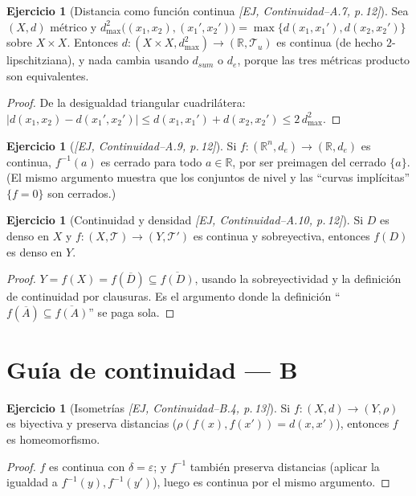 \documentclass[11pt,a4paper]{article}
\theoremstyle{definition}
\newtheorem{ejercicio}[definicion]{Ejercicio}
\theoremstyle{plain}
\newcommand{\fnt}[1]{{\normalfont\small\itshape\color{gray!150!black}[#1]}}
\newcommand{\R}{\mathbb{R}}
\newcommand{\cl}[1]{\overline{#1}}
\newcommand{\tp}{\mathcal{T}}
\begin{document}
\begin{ejercicio}[Distancia como función continua \fnt{EJ, Continuidad--A.7, p.\,12}]
Sea $(X,d)$ métrico y $d^2_{\max}\big((x_1,x_2),(x_1',x_2')\big)=\max\{d(x_1,x_1'),d(x_2,x_2')\}$ sobre $X\times X$. Entonces $d:(X\times X,d^2_{\max})\to(\R,\tp_u)$ es continua (de hecho $2$-lipschitziana), y nada cambia usando $d_{sum}$ o $d_e$, porque las tres métricas producto son equivalentes.
\end{ejercicio}

\begin{proof}
De la desigualdad triangular cuadrilátera: $|d(x_1,x_2)-d(x_1',x_2')|\le d(x_1,x_1')+d(x_2,x_2')\le 2\,d^2_{\max}$.
\end{proof}

\begin{ejercicio}[\fnt{EJ, Continuidad--A.9, p.\,12}]
Si $f:(\R^n,d_e)\to(\R,d_e)$ es continua, $f^{-1}(a)$ es cerrado para todo $a\in\R$, por ser preimagen del cerrado $\{a\}$. (El mismo argumento muestra que los conjuntos de nivel y las ``curvas implícitas'' $\{f=0\}$ son cerrados.)
\end{ejercicio}

\begin{ejercicio}[Continuidad y densidad \fnt{EJ, Continuidad--A.10, p.\,12}]
Si $D$ es denso en $X$ y $f:(X,\tp)\to(Y,\tp')$ es continua y sobreyectiva, entonces $f(D)$ es denso en $Y$.
\end{ejercicio}

\begin{proof}
$Y=f(X)=f(\cl D)\subseteq\cl{f(D)}$, usando la sobreyectividad y la definición de continuidad por clausuras. Es el argumento donde la definición ``$f(\cl A)\subseteq\cl{f(A)}$'' se paga sola.
\end{proof}

\section{Guía de continuidad --- B}

\begin{ejercicio}[Isometrías \fnt{EJ, Continuidad--B.4, p.\,13}]
Si $f:(X,d)\to(Y,\rho)$ es biyectiva y preserva distancias ($\rho(f(x),f(x'))=d(x,x')$), entonces $f$ es homeomorfismo.
\end{ejercicio}

\begin{proof}
$f$ es continua con $\delta=\varepsilon$; y $f^{-1}$ también preserva distancias (aplicar la igualdad a $f^{-1}(y),f^{-1}(y')$), luego es continua por el mismo argumento.
\end{proof}
\end{document}
